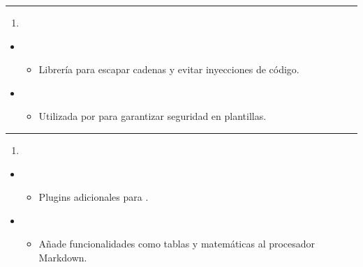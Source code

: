 \documentclass[a4paper,10pt,oneside,spanish,openany]{sphinxmanual}
\begin{document}
\bigskip\hrule\bigskip

\begin{enumerate}
%
\setcounter{enumi}{10}
\item {} 
\sphinxAtStartPar
{}

\end{enumerate}
\begin{itemize}
\item {} 
\sphinxAtStartPar
{}
\begin{itemize}
\item {} 
\sphinxAtStartPar
Librería para escapar cadenas y evitar inyecciones de código.

\end{itemize}

\item {} 
\sphinxAtStartPar
{}
\begin{itemize}
\item {} 
\sphinxAtStartPar
Utilizada por  para garantizar seguridad en plantillas.

\end{itemize}

\end{itemize}


\bigskip\hrule\bigskip

\begin{enumerate}
%
\setcounter{enumi}{11}
\item {} 
\sphinxAtStartPar
{}

\end{enumerate}
\begin{itemize}
\item {} 
\sphinxAtStartPar
{}
\begin{itemize}
\item {} 
\sphinxAtStartPar
Plugins adicionales para .

\end{itemize}

\item {} 
\sphinxAtStartPar
{}
\begin{itemize}
\item {} 
\sphinxAtStartPar
Añade funcionalidades como tablas y matemáticas al procesador Markdown.

\end{itemize}

\end{itemize}
\end{document}
